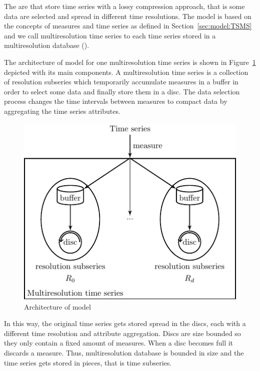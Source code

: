 The  are  that store time series with a lossy
compression approach, that is some data are selected and spread
in different time resolutions. The  model is based on the
concepts of measures and time series as defined in
Section~\ref{sec:model:TSMS} and we call multiresolution time series
to each time series stored in a multiresolution database
().


The architecture of  model for one multiresolution time series is
shown in Figure~\ref{fig:model:mtsdb} depicted with its main
components.  A multiresolution time series is a collection of
resolution subseries which temporarily accumulate measures in a buffer
in order to select some data and finally store them in a
disc. The data selection process changes the time intervals
between measures to compact data by aggregating the time series
attributes.

\begin{figure}
  \centering
  \includegraphics{fig_model_mtsdb.pdf}
  \caption{Architecture of  model}
  \label{fig:model:mtsdb}
\end{figure}


In this way, the original time series gets stored spread in the discs,
each with a different time resolution and attribute aggregation.
Discs are size bounded so they only contain a fixed amount of
measures. When a disc becomes full it discards a measure. Thus,
multiresolution database is bounded in size and the time series gets
stored in pieces, that is time subseries.

